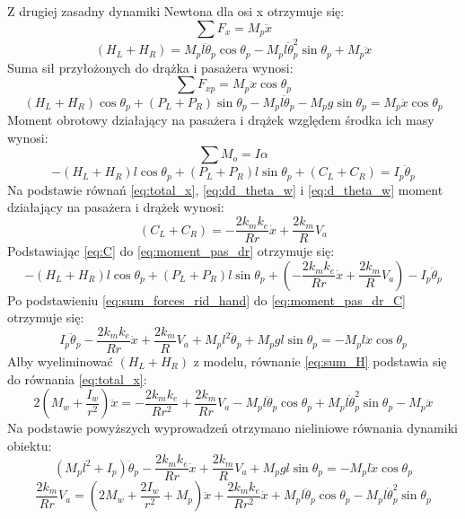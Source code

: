 Z drugiej zasadny dynamiki Newtona dla osi x otrzymuje się:
\begin{equation}
\sum F_x=M_p\ddot x
\end{equation}
\begin{equation}
(H_L+H_R)=M_pl\ddot \theta_p\cos \theta_p-M_pl\dot \theta_p^2\sin \theta_p+M_p\ddot x
\label{eq:sum_H}
\end{equation}
Suma sił przyłożonych do drążka i pasażera wynosi:
\begin{equation}
\sum F_{xp}=M_p\ddot x\cos \theta_p
\end{equation}
\begin{equation}
(H_L+H_R)\cos \theta_p+(P_L+P_R)\sin \theta_p-M_pl\ddot \theta_p-M_pg \sin \theta_p=M_p \ddot x \cos \theta_p
\label{eq:sum_forces_rid_hand}
\end{equation}
Moment obrotowy działający na pasażera i drążek względem środka ich masy wynosi:
\begin{equation}
\sum M_o=I\alpha
\end{equation}
\begin{equation}
-(H_L+H_R)l\cos \theta_p+(P_L+P_R)l\sin \theta_p+(C_L+C_R)=I_p\ddot \theta_p
\label{eq:moment_pas_dr}
\end{equation}
Na podstawie równań \eqref{eq:total_x}, \eqref{eq:dd_theta_w} i \eqref{eq:d_theta_w} moment działający na pasażera i drążek wynosi:
\begin{equation}
(C_L+C_R)=-\frac{2k_mk_e}{Rr}\dot x+\frac{2k_m}{R}V_a
\label{eq:sum_C}
\end{equation}
Podstawiając \eqref{eq:C} do \eqref{eq:moment_pas_dr} otrzymuje się:
\begin{equation}
-(H_L+H_R)l\cos \theta_p+(P_L+P_R)l\sin \theta_p+(-\frac{2k_mk_e}{Rr}\dot x+\frac{2k_m}{R}V_a)-I_p\ddot \theta_p
\label{eq:moment_pas_dr_C}
\end{equation}
Po podstawieniu \eqref{eq:sum_forces_rid_hand} do \eqref{eq:moment_pas_dr_C} otrzymuje się:
\begin{equation}
I_p\ddot \theta_p-\frac{2k_mk_e}{Rr}\dot x+\frac{2k_m}{R}V_a+M_pl^2\ddot \theta_p+M_pgl \sin \theta_p=-M_pl\ddot x\cos \theta_p
\end{equation}
Alby wyeliminować \((H_L+H_R)\) z modelu, równanie \eqref{eq:sum_H} podstawia się do równania \eqref{eq:total_x}:
\begin{equation}
2(M_w+\frac{I_w}{r^2})\ddot x=-\frac{2k_mk_e}{Rr^2}+\frac{2k_m}{Rr}V_a-M_pl\ddot \theta_p \cos \theta_p+M_pl\dot \theta_p^2\sin \theta_p-M_p\ddot x
\end{equation}
Na podstawie powyższych wyprowadzeń otrzymano nieliniowe równania dynamiki obiektu:
\begin{equation}
(M_pl^2+I_p)\ddot \theta_p-\frac{2k_mk_e}{Rr}\dot{x}+\frac{2k_m}{R}V_a+M_pgl\sin \theta_p=-M_pl\ddot x\cos \theta_p
\end{equation}
\begin{equation}
\frac{2k_m}{Rr}V_a=(2M_w+\frac{2I_w}{r^2}+M_p)\ddot x+\frac{2k_mk_e}{Rr^2}\dot x+M_pl\ddot \theta_p\cos \theta_p-M_pl\dot \theta_p^2\sin \theta_p
\end{equation}


